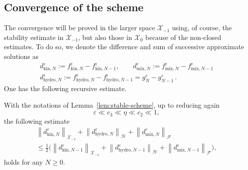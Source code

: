 \documentclass[10pt]{amsart}
\theoremstyle{definition}\newtheorem{defi}[theo]{Definition}\newtheorem{rema}[theo]{Remark}\newtheorem{exam}[theo]{Example}\newtheorem{exem}[theo]{Example}\newtheorem{nota}[theo]{Notation}
\newcommand{\hyd}{\mathrm{hydro}}
\newcommand{\mix}{\mathrm{mix}}
\newcommand{\kin}{\mathrm{kin}}
\newcommand{\FFF}{\mathscr{F}}
\newcommand{\HHH}{\mathscr{H}}
\newcommand{\GGG}{\mathscr{X}}
\newcommand{\SSSs}{\HHH}
\newcommand{\SSSh}{\pmb{\GGG}}
\newcommand{\SSSm}{\FFF}
\renewcommand*\le{\leqslant}
\renewcommand*\ge{\geqslant}
\newcommand*\eps{{\varepsilon}}
\begin{document}
\subsection{Convergence of the scheme}

The convergence will be proved in the larger space $\SSSh_{-1}$ using, of course, the stability estimate in $\SSSh_{-1} $, but also those in $\SSSh_0$ because of the non-closed estimates. To do so, we denote the difference and sum of successive approximate solutions as
\begin{gather*}
d^\eps_{\kin, N} := f^\eps_{\kin, N} - f^\eps_{\kin, N-1}, \qquad d^\eps_{\mix, N} := f^\eps_{\mix, N} - f^\eps_{\mix, N-1}\\
d^\eps_{\hyd, N} := f^\eps_{\hyd, N} - f^\eps_{\hyd, N-1} = g^\eps_N - g^\eps_{N-1}\,.
\end{gather*}
One has the following recursive estimate.

\begin{prop}
With the notations of Lemma~\ref{lem:stable-scheme}, up to reducing again
\[
\eps \ll c_3 \ll \eta \ll c_2 \ll 1,
\]
the following estimate
\begin{multline*}
\left\| d^\eps_{\kin, N} \right\|_{ \SSSh_{-1}} + 
\left\| d^\eps_{\hyd, N} \right\|_{ \SSSs } + \left\| d^\eps_{\mix, N} \right\|_{ \SSSm } \\
\le \frac{1}{2} \Bigg(\left\| d^\eps_{\kin, N-1} \right\|_{\SSSh_{-1}} + \left\| d^\eps_{\hyd, N-1}\right\|_{\SSSs} + \left\| d^\eps_{\mix, N-1}\right\|_{\SSSm}\Bigg),
\end{multline*}
holds for any $N\ge0.$
\end{prop}
\end{document}
